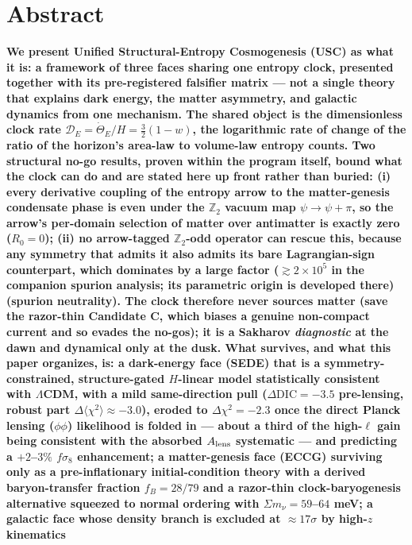 \documentclass[submission, Phys]{SciPost}
\begin{document}
\section*{Abstract}
{\bf
We present Unified Structural-Entropy Cosmogenesis (USC) as what it is:
\textbf{a framework of three faces sharing one entropy clock, presented
together with its pre-registered falsifier matrix} --- not a single
theory that explains dark energy, the matter asymmetry, and galactic
dynamics from one mechanism. The shared object is the dimensionless
clock rate \(\mathcal{D}_E = \dot\Theta_E/H = \tfrac{3}{2}(1-w)\), the
logarithmic rate of change of the ratio of the horizon's area-law to
volume-law entropy counts. Two structural no-go results, proven within
the program itself, bound what the clock can do and are stated here up
front rather than buried: \textbf{(i)} every derivative coupling of the
entropy arrow to the matter-genesis condensate phase is even under the
\(\mathbb{Z}_2\) vacuum map \(\psi\to\psi+\pi\), so the arrow's
per-domain selection of matter over antimatter is exactly zero
(\(R_0 = 0\)); \textbf{(ii)} no arrow-tagged \(\mathbb{Z}_2\)-odd
operator can rescue this, because any symmetry that admits it also
admits its bare Lagrangian-sign counterpart, which dominates by a large
factor (\(\gtrsim 2\times 10^5\) in the companion spurion analysis; its
parametric origin is developed there) (spurion neutrality). The clock
therefore never sources matter (save the razor-thin Candidate C, which
biases a genuine non-compact current and so evades the no-gos); it is a
Sakharov \emph{diagnostic} at the dawn and dynamical only at the dusk.
What survives, and what this paper organizes, is: a dark-energy face
(SEDE) that is a symmetry-constrained, structure-gated \(H\)-linear
model statistically consistent with \(\Lambda\)CDM, with a mild
same-direction pull (\(\Delta\mathrm{DIC} = -3.5\) pre-lensing, robust
part \(\Delta\langle\chi^2\rangle \approx -3.0\)), eroded to
\(\Delta\chi^2 = -2.3\) once the direct Planck lensing (\(\phi\phi\))
likelihood is folded in --- about a third of the high-\(\ell\) gain
being consistent with the absorbed \(A_{\rm lens}\) systematic --- and
predicting a \(+2\)--\(3\%\) \(f\sigma_8\) enhancement; a matter-genesis
face (ECCG) surviving only as a pre-inflationary initial-condition
theory with a derived baryon-transfer fraction \(f_B = 28/79\) and a
razor-thin clock-baryogenesis alternative squeezed to normal ordering
with \(\Sigma m_\nu = 59\)--\(64\) meV; a galactic face whose density
branch is excluded at \(\approx 17\sigma\) by high-\(z\) kinematics
}
\end{document}

